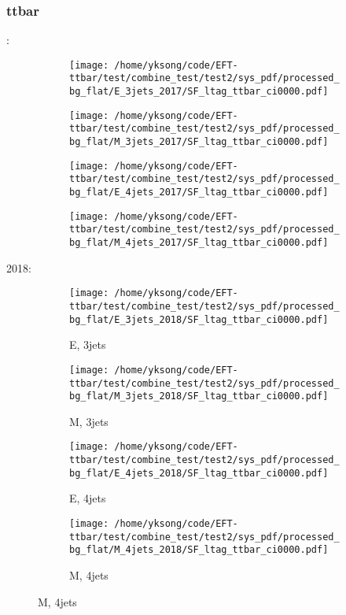 \documentclass{beamer}
\begin{document}
\begin{frame}
\frametitle{ttbar}
\fontsize{5}{1}:
\begin{figure}
\centering
\begin{subfigure}[b]{0.24\textwidth}
\texttt{[image: /home/yksong/code/EFT-ttbar/test/combine\_test/test2/sys\_pdf/processed\_bg\_flat/E\_3jets\_2017/SF\_ltag\_ttbar\_ci0000.pdf]}
\end{subfigure}
\begin{subfigure}[b]{0.24\textwidth}
\texttt{[image: /home/yksong/code/EFT-ttbar/test/combine\_test/test2/sys\_pdf/processed\_bg\_flat/M\_3jets\_2017/SF\_ltag\_ttbar\_ci0000.pdf]}
\end{subfigure}
\begin{subfigure}[b]{0.24\textwidth}
\texttt{[image: /home/yksong/code/EFT-ttbar/test/combine\_test/test2/sys\_pdf/processed\_bg\_flat/E\_4jets\_2017/SF\_ltag\_ttbar\_ci0000.pdf]}
\end{subfigure}
\begin{subfigure}[b]{0.24\textwidth}
\texttt{[image: /home/yksong/code/EFT-ttbar/test/combine\_test/test2/sys\_pdf/processed\_bg\_flat/M\_4jets\_2017/SF\_ltag\_ttbar\_ci0000.pdf]}
\end{subfigure}
\end{figure}
2018:
\begin{figure}
\centering
\begin{subfigure}[b]{0.24\textwidth}
\texttt{[image: /home/yksong/code/EFT-ttbar/test/combine\_test/test2/sys\_pdf/processed\_bg\_flat/E\_3jets\_2018/SF\_ltag\_ttbar\_ci0000.pdf]}
\captionsetup{font=tiny}
\caption{E, 3jets}
\end{subfigure}
\begin{subfigure}[b]{0.24\textwidth}
\texttt{[image: /home/yksong/code/EFT-ttbar/test/combine\_test/test2/sys\_pdf/processed\_bg\_flat/M\_3jets\_2018/SF\_ltag\_ttbar\_ci0000.pdf]}
\captionsetup{font=tiny}
\caption{M, 3jets}
\end{subfigure}
\begin{subfigure}[b]{0.24\textwidth}
\texttt{[image: /home/yksong/code/EFT-ttbar/test/combine\_test/test2/sys\_pdf/processed\_bg\_flat/E\_4jets\_2018/SF\_ltag\_ttbar\_ci0000.pdf]}
\captionsetup{font=tiny}
\caption{E, 4jets}
\end{subfigure}
\begin{subfigure}[b]{0.24\textwidth}
\texttt{[image: /home/yksong/code/EFT-ttbar/test/combine\_test/test2/sys\_pdf/processed\_bg\_flat/M\_4jets\_2018/SF\_ltag\_ttbar\_ci0000.pdf]}
\captionsetup{font=tiny}
\caption{M, 4jets}
\end{subfigure}
\end{figure}
\end{frame}
\end{document}
